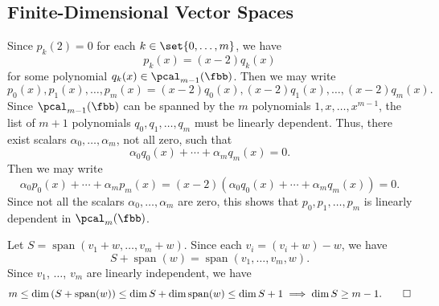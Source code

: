 \subsection{Finite-Dimensional Vector Spaces}


\begin{me}
    Since $p_k(2) = 0$ for each $k \in \set{0, \ldots, m}$, we have
    \[
    	p_k(x) = (x - 2)q_k(x)
    \]
    for some polynomial $q_k(x) \in \pcal_{m-1}(\fbb)$.
	Then we may write
    \[
    	p_0(x), p_1(x), \ldots, p_m(x) = (x - 2)q_0(x), (x - 2)q_1(x), \ldots, (x - 2)q_m(x).
    \]
    Since $\pcal_{m - 1}(\fbb)$ can be spanned by the $m$ polynomials $1, x, \ldots, x^{m-1}$, the list of $m + 1$ polynomials $q_0, q_1, \ldots, q_m$ must be linearly dependent.
	Thus, there exist scalars $\alpha_0, \ldots, \alpha_m$, not all zero, such that
    \[
    	\alpha_0 q_0(x) + \cdots + \alpha_m q_m(x) = 0.
    \]
    Then we may write
    \[
    	\alpha_0 p_0(x) + \cdots + \alpha_m p_m(x) = (x - 2)(\alpha_0 q_0(x) + \cdots + \alpha_m q_m(x)) = 0.
    \]
    Since not all the scalars $\alpha_0, \ldots, \alpha_m$ are zero, this shows that $p_0, p_1, \ldots, p_m$ is linearly dependent in $\pcal_m(\fbb)$.
\end{me}


\begin{csp}
    Let $S=\operatorname{span}(v_1+w, \dots, v_m+w)$.
	Since each $v_i=(v_i+w)-w$, we have
    \[
    	S+\operatorname{span}(w)=\operatorname{span}(v_1, \dots, v_m,w).
    \]
    Since $v_1$, $\dots$, $v_m$ are linearly independent, we have
    \[
    	m \leq \dim \left(S+\operatorname{span}(w) \right) \leq \dim S+\dim \operatorname{span}(w) \leq \dim S+1 \implies \dim S \geq m-1. \qedhere
    \]
\end{csp}